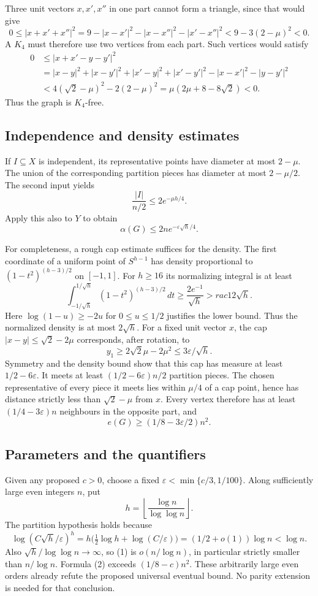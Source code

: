 Three unit vectors $x,x',x''$ in one part cannot form a triangle, since that would give
\[
 0\le|x+x'+x''|^2
 =9-|x-x'|^2-|x-x''|^2-|x'-x''|^2
 <9-3(2-\mu)^2<0.
\]
A $K_4$ must therefore use two vertices from each part. Such vertices would satisfy
\begin{align*}
0&\le|x+x'-y-y'|^2\\
 &=|x-y|^2+|x-y'|^2+|x'-y|^2+|x'-y'|^2
   -|x-x'|^2-|y-y'|^2\\
 &<4(\sqrt2-\mu)^2-2(2-\mu)^2
 =\mu(2\mu+8-8\sqrt2)<0.
\end{align*}
Thus the graph is $K_4$-free.

\subsection*{Independence and density estimates}
If $I\subseteq X$ is independent, its representative points have diameter at most $2-\mu$. The union of the corresponding partition pieces has diameter at most $2-\mu/2$. The second input yields
\[
 \frac{|I|}{n/2}\le2e^{-\mu h/4}.
\]
Apply this also to $Y$ to obtain
\[
 \alpha(G)\le2n e^{-\varepsilon\sqrt h/4}. \tag{1}
\]

For completeness, a rough cap estimate suffices for the density. The first coordinate of a uniform point of $S^{h-1}$ has density proportional to $(1-t^2)^{(h-3)/2}$ on $[-1,1]$. For $h\ge16$ its normalizing integral is at least
\[
 \int_{-1/\sqrt h}^{1/\sqrt h}(1-t^2)^{(h-3)/2}\,dt
 \ge\frac{2e^{-1}}{\sqrt h}>rac{1}{2\sqrt h}.
\]
Here $\log(1-u)\ge-2u$ for $0\le u\le1/2$ justifies the lower bound. Thus the normalized density is at most $2\sqrt h$.
For a fixed unit vector $x$, the cap $|x-y|\le\sqrt2-2\mu$ corresponds, after rotation, to
\[
 y_1\ge 2\sqrt2\mu-2\mu^2\le3\varepsilon/\sqrt h.
\]
Symmetry and the density bound show that this cap has measure at least $1/2-6\varepsilon$. It meets at least $(1/2-6\varepsilon)n/2$ partition pieces. The chosen representative of every piece it meets lies within $\mu/4$ of a cap point, hence has distance strictly less than $\sqrt2-\mu$ from $x$. Every vertex therefore has at least $(1/4-3\varepsilon)n$ neighbours in the opposite part, and
\[
 e(G)\ge(1/8-3\varepsilon/2)n^2. \tag{2}
\]

\subsection*{Parameters and the quantifiers}
Given any proposed $c>0$, choose a fixed $\varepsilon<\min\{c/3,1/100\}$. Along sufficiently large even integers $n$, put
\[
 h=\left\lfloor\frac{\log n}{\log\log n}\right\rfloor.
\]
The partition hypothesis holds because
\[
 \log (C\sqrt h/\varepsilon)^h
 =h\bigl(\tfrac12\log h+\log(C/\varepsilon)\bigr)
 =(1/2+o(1))\log n<\log n.
\]
Also $\sqrt h/\log\log n\to\infty$, so (1) is $o(n/\log n)$, in particular strictly smaller than $n/\log n$. Formula (2) exceeds $(1/8-c)n^2$. These arbitrarily large even orders already refute the proposed universal eventual bound. No parity extension is needed for that conclusion.

